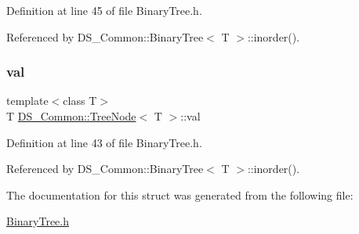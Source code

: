 Definition at line 45 of file Binary\+Tree.\+h.



Referenced by D\+S\+\_\+\+Common\+::\+Binary\+Tree$<$ T $>$\+::inorder().

\mbox{\label{struct_d_s___common_1_1_tree_node_a24807010f9e48c1a829c05e6384b199e}} 
\subsubsection{\texorpdfstring{val}{val}}
{\footnotesize\ttfamily template$<$class T$>$ \\
T \mbox{\hyperlink{struct_d_s___common_1_1_tree_node}{D\+S\+\_\+\+Common\+::\+Tree\+Node}}$<$ T $>$\+::val}



Definition at line 43 of file Binary\+Tree.\+h.



Referenced by D\+S\+\_\+\+Common\+::\+Binary\+Tree$<$ T $>$\+::inorder().



The documentation for this struct was generated from the following file\+:\begin{DoxyCompactItemize}
\item 
\mbox{\hyperlink{_binary_tree_8h}{Binary\+Tree.\+h}}\end{DoxyCompactItemize}
